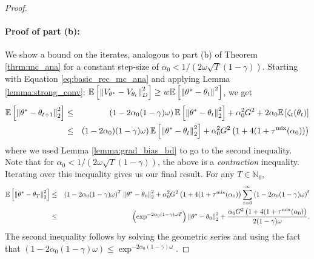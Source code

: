 \documentclass{colt2018} %
\DeclareMathOperator*{\mix}{mix}
\begin{document}
\begin{proof}
\paragraph{Proof of part (b):} We show a bound on the iterates, analogous to part (b) of Theorem \ref{thrm:mc_ana} for a constant step-size of $\alpha_0 < 1/(2 \omega \sqrt{T} (1-\gamma))$. Starting with Equation \eqref{eq:basic_rec_mc_ana} and applying Lemma \ref{lemma:strong_conv}: $\mathbb{E}\left[\norm{V_{\theta^*} - V_{\theta_t}}^2_{D}\right] \geq w \mathbb{E}\left[ \norm{\theta^* - \theta_t}^2 \right]$, we get
\begin{eqnarray}
\mathbb{E} \left[\norm{\theta^*-\theta_{t+1}}_2^2\right] &\leq& \left(1-2\alpha_0(1-\gamma)\omega \right) \mathbb{E} \left[\norm{\theta^*-\theta_t}_2^2\right] + \alpha_0^2 G^2 + 2\alpha_0 \mathbb{E}\left[\zeta_t(\theta_t)\right] \nonumber \\
&\leq& \left(1-2\alpha_0)(1-\gamma)\omega \right) \mathbb{E} \left[\norm{\theta^*-\theta_t}_2^2\right] + \alpha_0^2 G^2 \left(1 + 4 (1+\tau^{\mix}(\alpha_0)) \right) \label{eq:theta_rec}
\end{eqnarray}
where we used Lemma \ref{lemma:grad_bias_bd} to go to the second inequality. Note that for $\alpha_0 < 1/(2 \omega \sqrt{T} (1-\gamma))$, the above is a \emph{contraction} inequality. Iterating over this inequality gives us our final result. For any $T \in \mathbb{N}_0$,
\begin{eqnarray*}
\mathbb{E} \left[\norm{\theta^*-\theta_{T}}_2^2\right] &\leq& \left(1-2\alpha_0(1-\gamma)\omega \right)^T \norm{\theta^*-\theta_0}_2^2 + \alpha_0^2 G^2 \left(1 + 4 (1+\tau^{\mix}(\alpha_0) \right) \sum_{t=0}^{\infty}\left(1-2\alpha_0(1-\gamma)\omega \right)^t \\
&\leq& \left(\exp^{-2\alpha_0(1-\gamma)\omega T}\right) \norm{\theta^*-\theta_0}_2^2 + \frac{\alpha_0 G^2 \left(1 + 4 (1+\tau^{\mix}(\alpha_0) \right)}{2(1-\gamma)\omega}.
\end{eqnarray*}
The second inequality follows by solving the geometric series and using the fact that $\left(1-2\alpha_0(1-\gamma)\omega \right) \leq \exp^{-2\alpha_0(1-\gamma)\omega}$.

\end{proof}
\end{document}
